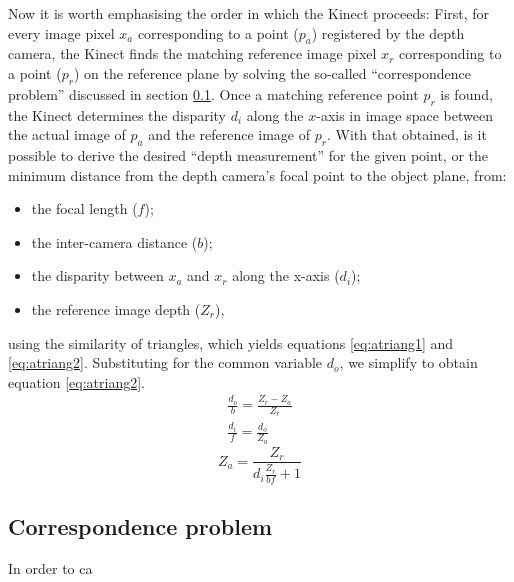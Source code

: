 Now it is worth emphasising the order in which the Kinect proceeds: First, for
every image pixel $x_a$ corresponding to a point ($p_a$) registered by the depth
camera, the Kinect finds the matching reference image pixel $x_r$ corresponding
to a point ($p_r$) on the reference plane by solving the so-called
``correspondence problem'' discussed in section \ref{sub:corr}. Once a matching
reference point $p_r$ is found, the Kinect determines the disparity $d_i$ along
the $x$-axis in image space between the actual image of $p_a$ and the reference
image of $p_r$. With that obtained, is it possible to derive the desired ``depth
measurement'' for the given point, or the minimum distance from the depth
camera's focal point to the object plane, from: 
\begin{itemize}

    \item the focal length ($f$);

    \item the inter-camera distance ($b$);

    \item the disparity between $x_a$ and $x_r$ along the x-axis ($d_i$);

    \item the reference image depth ($Z_r$),

\end{itemize}
using the similarity of triangles, which yields equations \ref{eq:atriang1} and
\ref{eq:atriang2}. Substituting for the common variable $d_o$, we simplify to
obtain equation \ref{eq:atriang2}.
\begin{align} 
    \frac{d_o}{b} = \frac{Z_r - Z_a}{Z_r} \label{eq:atriang1}\\
    \frac{d_i}{f} = \frac{d_o}{Z_a} \label{eq:atriang2}
\end{align}
\begin{equation} \label{eq:atriang2}
    Z_a = \frac{Z_r}{d_i \frac{Z_r}{b f} + 1}
\end{equation}

\subsection{Correspondence problem}
\label{sub:corr}

In order to ca



